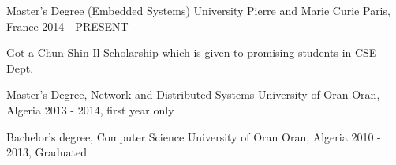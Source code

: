 

\begin{cventries}

  \cventry
    {Master's Degree (Embedded Systems)} %
    {University Pierre and Marie Curie} %
    {Paris, France} %
    {2014 - PRESENT} %
    {
      \begin{cvitems} %
        \item {Got a Chun Shin-Il Scholarship which is given to promising students in CSE Dept.}
      \end{cvitems}
    }

  \cventry
    {Master's Degree, Network and Distributed Systems} %
    {University of Oran} %
    {Oran, Algeria} %
    {2013 - 2014, first year only} %
    {
    }

  \cventry
    {Bachelor's degree, Computer Science} %
    {University of Oran} %
    {Oran, Algeria} %
    {2010 - 2013, Graduated} %
    {
    }

\end{cventries}
